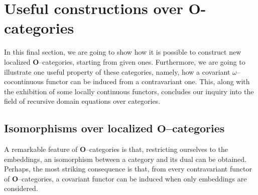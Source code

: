\section{Useful constructions over \(\mathbf{O}\)-categories}

In this final section, we are going to show how it is possible to construct new localized \(\mathbf{O}\)--categories, starting from given ones.
Furthermore, we are going to illustrate one useful property of these categories, namely, how a covariant \(\omega\)--cocontinuous functor can be induced from a contravariant one. %
This, along with the exhibition of some locally continuous functors, concludes our inquiry into the field of recursive domain equations over categories.

\subsection{Isomorphisms over localized \(\mathbf{O}\)--categories} %

A remarkable feature of \(\mathbf{O}\)--categories is that, restricting ourselves to the embeddings, an isomorphism between a category and its dual can be obtained.
Perhaps, the most striking consequence is that, from every contravariant functor of \(\mathbf{O}\)--categories, a covariant functor can be induced when only embeddings are considered.


